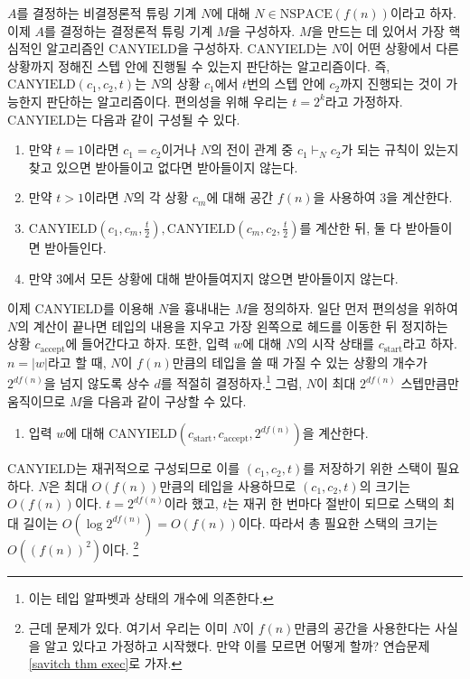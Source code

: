\documentclass[b5paper, 11pt]{book}
\theoremstyle{definition}
\newenvironment{pf*}{\pushQED{\qed}\pf}
{\popQED\endpf}
\begin{document}
\begin{pf*}
    $A$를 결정하는 비결정론적 튜링 기계 $N$에 대해 $N \in \text{NSPACE}(f(n))$이라고 하자. 이제 $A$를 결정하는 결정론적 튜링 기계 $M$을 구성하자. $M$을 만드는 데 있어서 가장 핵심적인 알고리즘인 CANYIELD을 구성하자. CANYIELD는 $N$이 어떤 상황에서 다른 상황까지 정해진 스텝 안에 진행될 수 있는지 판단하는 알고리즘이다. 즉, $\text{CANYIELD}(c_1, c_2, t)$는 $N$의 상황 $c_1$에서 $t$번의 스텝 안에 $c_2$까지 진행되는 것이 가능한지 판단하는 알고리즘이다. 편의성을 위해 우리는 $t = 2^k$라고 가정하자. CANYIELD는 다음과 같이 구성될 수 있다.
    \begin{enumerate}
        \item 만약 $t = 1$이라면 $c_1 = c_2$이거나 $N$의 전이 관계 중
        $c_1 \vdash_N c_2$가 되는 규칙이 있는지 찾고 있으면 받아들이고 없다면 받아들이지 않는다.
        \item 만약 $t > 1$이라면 $N$의 각 상황 $c_m$에 대해 공간 $f(n)$을 사용하여 3을 계산한다.
        \item $\text{CANYIELD}(c_1, c_m, \frac{t}{2}), \text{CANYIELD}(c_m, c_2, \frac{t}{2})$를 계산한 뒤, 둘 다 받아들이면 받아들인다.
        \item 만약 3에서 모든 상황에 대해 받아들여지지 않으면 받아들이지 않는다.
    \end{enumerate}
    이제 CANYIELD를 이용해 $N$을 흉내내는 $M$을 정의하자. 일단 먼저 편의성을 위하여 $N$의 계산이 끝나면 테입의 내용을 지우고 가장 왼쪽으로 헤드를 이동한 뒤 정지하는 상황 $c_\text{accept}$에 들어간다고 하자. 또한, 입력 $w$에 대해 $N$의 시작 상태를 $c_\text{start}$라고 하자. $n = \vert w \vert$라고 할 때, $N$이 $f(n)$만큼의 테입을 쓸 때 가질 수 있는 상황의 개수가 $2^{df(n)}$을 넘지 않도록 상수 $d$를 적절히 결정하자.\footnote{이는 테입 알파벳과 상태의 개수에 의존한다.} 그럼, $N$이 최대 $2^{df(n)}$ 스텝만큼만 움직이므로 $M$을 다음과 같이 구상할 수 있다.
    \begin{enumerate}
        \item 입력 $w$에 대해 $\text{CANYIELD}(c_{\text{start}}, c_{\text{accept}}, 2^{df(n)})$을 계산한다.
    \end{enumerate}
    CANYIELD는 재귀적으로 구성되므로 이를 $(c_1, c_2, t)$를 저장하기 위한 스택이 필요하다. $N$은 최대 $O(f(n))$만큼의 테입을 사용하므로 $(c_1, c_2, t)$의 크기는 $O(f(n))$이다.  $t=2^{df(n)}$이라 했고, $t$는 재귀 한 번마다 절반이 되므로 스택의 최대 길이는 $O(\log{2^{df(n)}}) = O(f(n))$이다. 따라서 총 필요한 스택의 크기는 $O((f(n))^2)$이다. \footnote{근데 문제가 있다. 여기서 우리는 이미 $N$이 $f(n)$만큼의 공간을 사용한다는 사실을 알고 있다고 가정하고 시작했다. 만약 이를 모르면 어떻게 할까? 연습문제 \ref{savitch thm exec}로 가자.}
\end{pf*}
\end{document}
